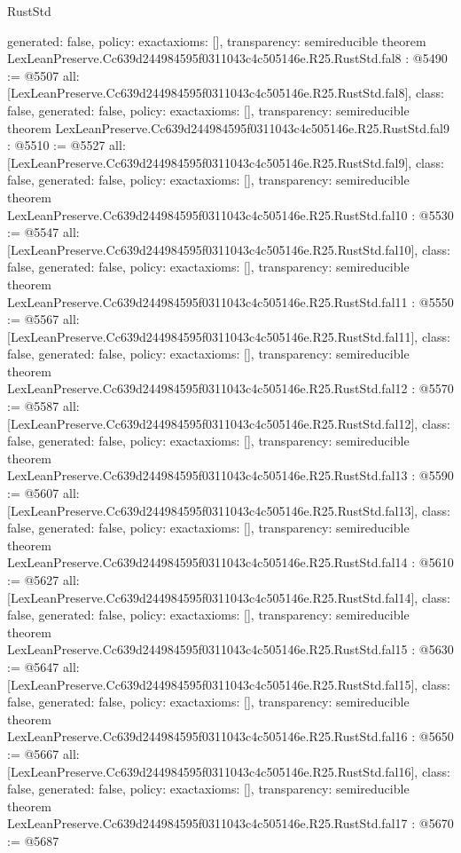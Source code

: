 \begin{lexlean}{RustStd}
\begin{coremodule}
{  generated: false,
  policy: exact{axioms: []},
  transparency: semireducible
}
theorem LexLeanPreserve.Cc639d244984595f0311043c4c505146e.R25.RustStd.fal8 : @5490 := @5507 {
  all: [LexLeanPreserve.Cc639d244984595f0311043c4c505146e.R25.RustStd.fal8],
  class: false,
  generated: false,
  policy: exact{axioms: []},
  transparency: semireducible
}
theorem LexLeanPreserve.Cc639d244984595f0311043c4c505146e.R25.RustStd.fal9 : @5510 := @5527 {
  all: [LexLeanPreserve.Cc639d244984595f0311043c4c505146e.R25.RustStd.fal9],
  class: false,
  generated: false,
  policy: exact{axioms: []},
  transparency: semireducible
}
theorem LexLeanPreserve.Cc639d244984595f0311043c4c505146e.R25.RustStd.fal10 : @5530 := @5547 {
  all: [LexLeanPreserve.Cc639d244984595f0311043c4c505146e.R25.RustStd.fal10],
  class: false,
  generated: false,
  policy: exact{axioms: []},
  transparency: semireducible
}
theorem LexLeanPreserve.Cc639d244984595f0311043c4c505146e.R25.RustStd.fal11 : @5550 := @5567 {
  all: [LexLeanPreserve.Cc639d244984595f0311043c4c505146e.R25.RustStd.fal11],
  class: false,
  generated: false,
  policy: exact{axioms: []},
  transparency: semireducible
}
theorem LexLeanPreserve.Cc639d244984595f0311043c4c505146e.R25.RustStd.fal12 : @5570 := @5587 {
  all: [LexLeanPreserve.Cc639d244984595f0311043c4c505146e.R25.RustStd.fal12],
  class: false,
  generated: false,
  policy: exact{axioms: []},
  transparency: semireducible
}
theorem LexLeanPreserve.Cc639d244984595f0311043c4c505146e.R25.RustStd.fal13 : @5590 := @5607 {
  all: [LexLeanPreserve.Cc639d244984595f0311043c4c505146e.R25.RustStd.fal13],
  class: false,
  generated: false,
  policy: exact{axioms: []},
  transparency: semireducible
}
theorem LexLeanPreserve.Cc639d244984595f0311043c4c505146e.R25.RustStd.fal14 : @5610 := @5627 {
  all: [LexLeanPreserve.Cc639d244984595f0311043c4c505146e.R25.RustStd.fal14],
  class: false,
  generated: false,
  policy: exact{axioms: []},
  transparency: semireducible
}
theorem LexLeanPreserve.Cc639d244984595f0311043c4c505146e.R25.RustStd.fal15 : @5630 := @5647 {
  all: [LexLeanPreserve.Cc639d244984595f0311043c4c505146e.R25.RustStd.fal15],
  class: false,
  generated: false,
  policy: exact{axioms: []},
  transparency: semireducible
}
theorem LexLeanPreserve.Cc639d244984595f0311043c4c505146e.R25.RustStd.fal16 : @5650 := @5667 {
  all: [LexLeanPreserve.Cc639d244984595f0311043c4c505146e.R25.RustStd.fal16],
  class: false,
  generated: false,
  policy: exact{axioms: []},
  transparency: semireducible
}
theorem LexLeanPreserve.Cc639d244984595f0311043c4c505146e.R25.RustStd.fal17 : @5670 := @5687 {
}
\end{coremodule}
\end{lexlean}
